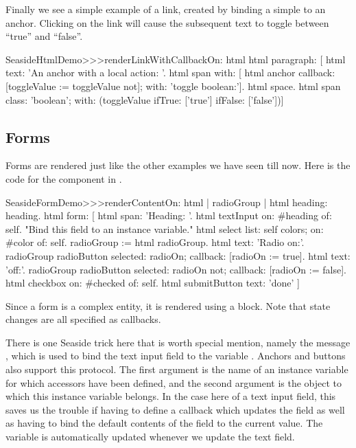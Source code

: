 \documentclass[a4paper,10pt,twoside]{book}
\begin{document}
Finally we see a simple example of a link, created by binding a simple  to an anchor.
Clicking on the link will cause the subsequent text to toggle between ``true'' and ``false''.

\begin{code}{}
SeasideHtmlDemo>>>renderLinkWithCallbackOn: html 
	html paragraph: [
		html text: 'An anchor with a local action: '.
		html span with: [
			html anchor
				callback: [toggleValue := toggleValue not];
				with: 'toggle boolean:'].
		html space.
		html span
			class: 'boolean';
			with: (toggleValue ifTrue: ['true'] ifFalse: ['false'])]
\end{code}


\subsection{Forms}

Forms are rendered just like the other examples we have seen till now.
Here is the code for the  component in .

\begin{code}{}
SeasideFormDemo>>>renderContentOn: html
	| radioGroup |
	html heading: heading.
	html form: [
		html span: 'Heading: '.
		html textInput on: #heading of: self. "Bind this field to an instance variable."
		html select
			list: self colors;
			on: #color of: self.
		radioGroup := html radioGroup.
		html text: 'Radio on:'.
		radioGroup radioButton
			selected: radioOn;
			callback: [radioOn := true].
		html text: 'off:'.
		radioGroup radioButton
			selected: radioOn not;
			callback: [radioOn := false].
		html checkbox on: #checked of: self.
		html submitButton
			text: 'done'
		]
\end{code}{}

Since a form is a complex entity, it is rendered using a block.
Note that state changes are all specified as callbacks.

There is one Seaside trick here that is worth special mention, namely the message , which is used to bind the text input field to the variable .
Anchors and buttons also support this protocol.
The first argument is the name of an instance variable for which accessors have been defined, and the second argument is the object to which this instance variable belongs.
In the case here of a text input field, this saves us the trouble if having to define a callback which updates the field as well as having to bind the default contents of the field to the current value.
The  variable is automatically updated whenever we update the text field.
\end{document}
